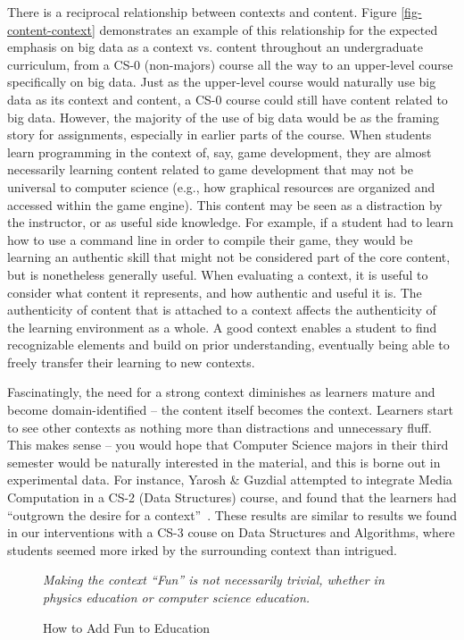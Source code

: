 There is a reciprocal relationship between contexts and content.
Figure \ref{fig-content-context} demonstrates an example of this relationship for the expected emphasis on big data as a context vs. content throughout an undergraduate curriculum, from a CS-0 (non-majors) course all the way to an upper-level course specifically on big data.
Just as the upper-level course would naturally use big data as its context and content, a CS-0 course could still have content related to big data.
However, the majority of the use of big data would be as the framing story for assignments, especially in earlier parts of the course.
When students learn programming in the context of, say, game development, they are almost necessarily learning content related to game development that may not be universal to computer science (e.g., how graphical resources are organized and accessed within the game engine).
This content may be seen as a distraction by the instructor, or as useful side knowledge. For example, if a student had to learn how to use a command line in order to compile their game, they would be learning an authentic skill that might not be considered part of the core content, but is nonetheless generally useful.
When evaluating a context, it is useful to consider what content it represents, and how authentic and useful it is.
The authenticity of content that is attached to a context affects the authenticity of the learning environment as a whole.
A good context enables a student to find recognizable elements and build on prior understanding, eventually being able to freely transfer their learning to new contexts.

Fascinatingly, the need for a strong context diminishes as learners mature and become domain-identified -- the content itself becomes the context.
Learners start to see other contexts as nothing more than distractions and unnecessary fluff.
This makes sense -- you would hope that Computer Science majors in their third semester would be naturally interested in the material, and this is borne out in experimental data.
For instance, Yarosh \& Guzdial attempted to integrate Media Computation in a CS-2 (Data Structures) course, and found that the learners had ``outgrown the desire for a context''~\cite{yarosh2008narrating}. 
These results are similar to results we found in our interventions with a CS-3 couse on Data Structures and Algorithms, where students seemed more irked by the surrounding context than intrigued.


\begin{figure}[!ht]
	\begin{center}
	\end{center}
	\caption{How to Add Fun to Education}
	\textit{Making the context ``Fun'' is not necessarily trivial, whether in physics education or computer science education.~\cite{SMBC}}
	\label{fig-comic-context}
\end{figure}

